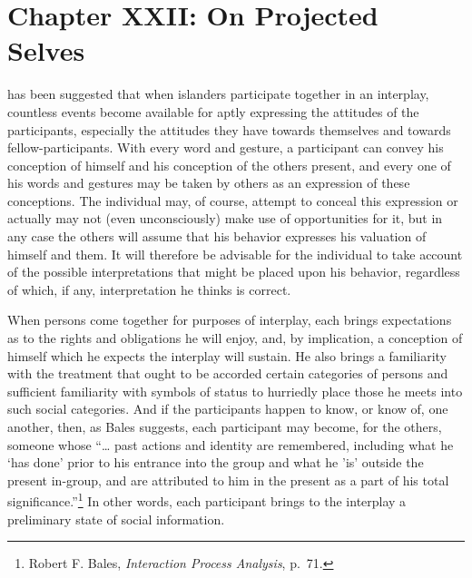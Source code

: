 \documentclass[openany,nobib]{tufte-book}
\let\oldchapter\chapter
\def\chapter{%
  \setcounter{footnote}{0}%
  \oldchapter
}
\begin{document}
\chapter[CHAPTER XXII: ON PROJECTED SELVES]{Chapter XXII: On Projected Selves}
\label{ch:Chapter XXII: On Projected Selves}

has been suggested that when islanders
participate together in an interplay, countless events become available
for aptly expressing the attitudes of the participants, especially the
attitudes they have towards themselves and towards fellow-participants.
With every word and gesture, a participant can convey his conception of
himself and his conception of the others present, and every one of his
words and gestures may be taken by others as an expression of these
conceptions. The individual may, of course, attempt to conceal this
expression or actually may not (even unconsciously) make use of
opportunities for it, but in any case the others will assume that his
behavior expresses his valuation of himself and them. It will therefore
be advisable for the individual to take account of the possible
interpretations that might be placed upon his behavior, regardless of
which, if any, interpretation he thinks is correct.

When persons come together for purposes of interplay, each brings
expectations as to the rights and obligations he will enjoy, and, by
implication, a conception of himself which he expects the interplay will
sustain. He also brings a familiarity with the treatment that ought to
be accorded certain categories of persons and sufficient familiarity
with symbols of status to hurriedly place those he meets into such
social categories. And if the participants happen to know, or know of,
one another, then, as Bales suggests, each participant may become, for
the others, someone whose ``\ldots{} past actions and identity are
remembered, including what he `has done' prior to his entrance into the
group and what he 'is' outside the present in-group, and are attributed
to him in the present as a part of his total significance.''\footnote{Robert
  F. Bales, \emph{Interaction Process Analysis}, p.~71.} In other words,
each participant brings to the interplay a preliminary state of social
information.
\end{document}
